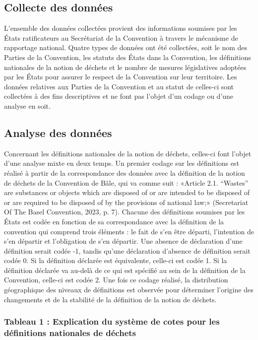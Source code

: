 \documentclass[12pt]{ulaval}
\begin{document}
\subsection{Collecte des données}\label{collecte-des-donnuxe9es}

L'ensemble des données collectées provient des informations soumises par les États ratificateurs au Secrétariat de la Convention à travers le mécanisme de rapportage national. Quatre types de données ont été collectées, soit le nom des Parties de la Convention, les statuts des États dans la Convention, les définitions nationales de la notion de déchets et le nombre de mesures législatives adoptées par les États pour assurer le respect de la Convention sur leur territoire. Les données relatives aux Parties de la Convention et au statut de celles-ci sont collectées à des fins descriptives et ne font pas l'objet d'un codage ou d'une analyse en soit.

\subsection{Analyse des données}\label{analyse-des-donnuxe9es}

Concernant les définitions nationales de la notion de déchets, celles-ci font l'objet d'une analyse mixte en deux temps. Un premier codage sur les définitions est réalisé à partir de la correspondance des données avec la définition de la notion de déchets de la Convention de Bâle, qui va comme suit : «Article 2.1. ``Wastes'' are substances or objects which are disposed of or are intended to be disposed of or are required to be disposed of by the provisions of national law;» (Secretariat Of The Basel Convention, 2023, p. 7). Chacune des définitions soumises par les États est codée en fonction de sa correspondance avec la définition de la convention qui comprend trois éléments : le fait de s'en être départi, l'intention de s'en départir et l'obligation de s'en départir. Une absence de déclaration d'une définition serait codée -1, tandis qu'une déclaration d'absence de définition serait codée 0. Si la définition déclarée est équivalente, celle-ci est codée 1. Si la définition déclarée va au-delà de ce qui est spécifié au sein de la définition de la Convention, celle-ci est codée 2. Une fois ce codage réalisé, la distribution géographique des niveaux de définitions est observée pour déterminer l'origine des changements et de la stabilité de la définition de la notion de déchets.

\subsubsection{Tableau 1 : Explication du système de cotes pour les définitions nationales de déchets}\label{tableau-1-explication-du-systuxe8me-de-cotes-pour-les-duxe9finitions-nationales-de-duxe9chets}
\end{document}

